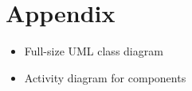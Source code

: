 \section{Appendix}
\begin{itemize}
	\item Full-size UML class diagram
        \item Activity diagram for  components
\end{itemize}
